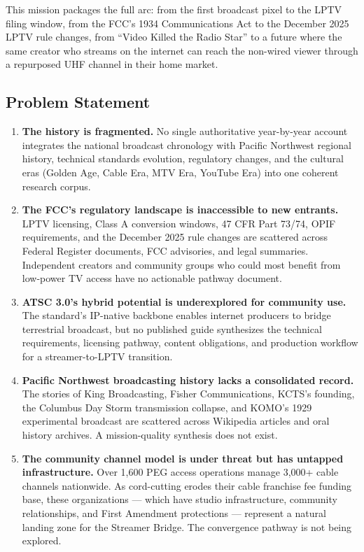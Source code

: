 \documentclass[11pt,letterpaper]{article}
\begin{document}
This mission packages the full arc: from the first broadcast pixel to the LPTV filing window, from the FCC's 1934 Communications Act to the December 2025 LPTV rule changes, from ``Video Killed the Radio Star'' to a future where the same creator who streams on the internet can reach the non-wired viewer through a repurposed UHF channel in their home market.

\subsection{Problem Statement}

\begin{enumerate}
  \item \textbf{The history is fragmented.} No single authoritative year-by-year account integrates the national broadcast chronology with Pacific Northwest regional history, technical standards evolution, regulatory changes, and the cultural eras (Golden Age, Cable Era, MTV Era, YouTube Era) into one coherent research corpus.

  \item \textbf{The FCC's regulatory landscape is inaccessible to new entrants.} LPTV licensing, Class A conversion windows, 47 CFR Part 73/74, OPIF requirements, and the December 2025 rule changes are scattered across Federal Register documents, FCC advisories, and legal summaries. Independent creators and community groups who could most benefit from low-power TV access have no actionable pathway document.

  \item \textbf{ATSC 3.0's hybrid potential is underexplored for community use.} The standard's IP-native backbone enables internet producers to bridge terrestrial broadcast, but no published guide synthesizes the technical requirements, licensing pathway, content obligations, and production workflow for a streamer-to-LPTV transition.

  \item \textbf{Pacific Northwest broadcasting history lacks a consolidated record.} The stories of King Broadcasting, Fisher Communications, KCTS's founding, the Columbus Day Storm transmission collapse, and KOMO's 1929 experimental broadcast are scattered across Wikipedia articles and oral history archives. A mission-quality synthesis does not exist.

  \item \textbf{The community channel model is under threat but has untapped infrastructure.} Over 1,600 PEG access operations manage 3,000+ cable channels nationwide. As cord-cutting erodes their cable franchise fee funding base, these organizations --- which have studio infrastructure, community relationships, and First Amendment protections --- represent a natural landing zone for the Streamer Bridge. The convergence pathway is not being explored.
\end{enumerate}
\end{document}
